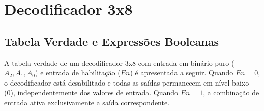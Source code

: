 \section{Decodificador 3x8}

\subsection{Tabela Verdade e Expressões Booleanas}

A tabela verdade de um decodificador 3x8 com entrada em binário puro ($A_2, A_1, A_0$) e entrada de habilitação ($En$) é apresentada a seguir. Quando $En = 0$, o decodificador está desabilitado e todas as saídas permanecem em nível baixo (0), independentemente dos valores de entrada. Quando $En = 1$, a combinação de entrada ativa exclusivamente a saída correspondente.

